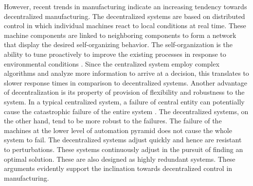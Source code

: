 \documentclass[10pt,conference,compsocconf]{IEEEtran}
\begin{document}
However, recent trends in manufacturing indicate an increasing tendency towards decentralized manufacturing. The decentralized systems are based on distributed control in which individual machines react to local conditions at real time. These machine components are linked to neighboring components to form a network that display the desired self-organizing behavior. The self-organization is the ability to tune proactively to improve the existing processes in response to environmental conditions \cite{Rolon_Martinez:2011:Agent-Based}. Since the centralized system employ complex algorithms and analyze more information to arrive at a decision, this translates to slower response times in comparison to decentralized systems. Another advantage of decentralization is its property of provision of flexibility and robustness to the system. In a typical centralized system, a failure of central entity can potentially cause the catastrophic failure of the entire system \cite{Anderson_Bartholdi:2000:Centralized_Vs}. The decentralized systems, on the other hand, tend to be more robust to the failures. The failure of the machines at the lower level of automation pyramid does not cause the whole system to fail. The decentralized systems adjust quickly and hence are resistant to perturbations. These systems continuously adjust in the pursuit of finding an optimal solution. These are also designed as highly redundant systems. These arguments evidently support the inclination towards decentralized control in manufacturing.
\end{document}
